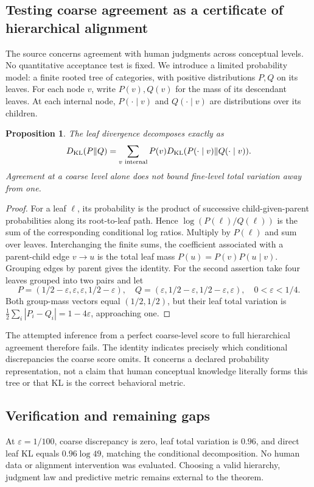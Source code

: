 \documentclass[11pt]{article}
\newtheorem{proposition}{Proposition}
\begin{document}
\subsection{Testing coarse agreement as a certificate of hierarchical alignment}
The source concerns agreement with human judgments across conceptual levels. No quantitative acceptance test is fixed. We introduce a limited probability model: a finite rooted tree of categories, with positive distributions $P,Q$ on its leaves. For each node $v$, write $P(v),Q(v)$ for the mass of its descendant leaves. At each internal node, $P(\cdot\mid v)$ and $Q(\cdot\mid v)$ are distributions over its children.
\begin{proposition}
The leaf divergence decomposes exactly as
\[
 D_{\rm KL}(P\|Q)=\sum_{v\text{ internal}} P(v)
 D_{\rm KL}(P(\cdot\mid v)\|Q(\cdot\mid v)).
\]
Agreement at a coarse level alone does not bound fine-level total variation away from one.
\end{proposition}
\begin{proof}
For a leaf $\ell$, its probability is the product of successive child-given-parent probabilities along its root-to-leaf path. Hence $\log(P(\ell)/Q(\ell))$ is the sum of the corresponding conditional log ratios. Multiply by $P(\ell)$ and sum over leaves. Interchanging the finite sums, the coefficient associated with a parent-child edge $v\to u$ is the total leaf mass $P(u)=P(v)P(u\mid v)$. Grouping edges by parent gives the identity.
For the second assertion take four leaves grouped into two pairs and let
\[
 P=(1/2-\varepsilon,\varepsilon,\varepsilon,1/2-\varepsilon),\quad
 Q=(\varepsilon,1/2-\varepsilon,1/2-\varepsilon,\varepsilon),
 \quad0<\varepsilon<1/4.
\]
Both group-mass vectors equal $(1/2,1/2)$, but their leaf total variation is $\tfrac12\sum_i|P_i-Q_i|=1-4\varepsilon$, approaching one.
\end{proof}
The attempted inference from a perfect coarse-level score to full hierarchical agreement therefore fails. The identity indicates precisely which conditional discrepancies the coarse score omits. It concerns a declared probability representation, not a claim that human conceptual knowledge literally forms this tree or that KL is the correct behavioral metric.
\subsection{Verification and remaining gaps}
At $\varepsilon=1/100$, coarse discrepancy is zero, leaf total variation is $0.96$, and direct leaf KL equals $0.96\log49$, matching the conditional decomposition. No human data or alignment intervention was evaluated. Choosing a valid hierarchy, judgment law and predictive metric remains external to the theorem.
\end{document}
